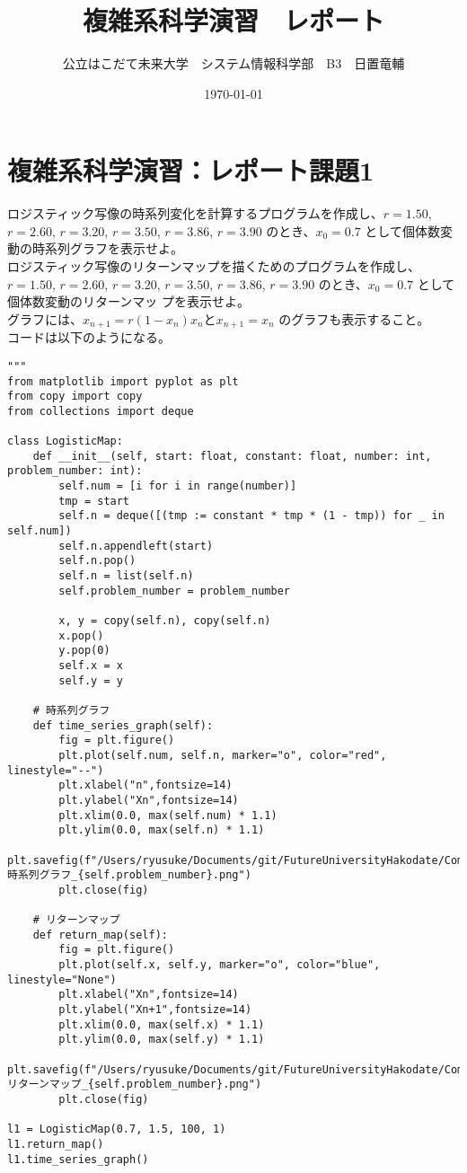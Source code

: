 \documentclass[dvipdfmx,uplatex]{jsarticle}
\title{複雑系科学演習　レポート}
\author{公立はこだて未来大学　システム情報科学部　B3　日置竜輔}
\date{\today}
\begin{document}
\maketitle
\tableofcontents %

\newpage

\section{複雑系科学演習：レポート課題1}

  ロジスティック写像の時系列変化を計算するプログラムを作成し、$r = 1.50$, $r = 2.60$, $r = 3.20$, $r = 3.50$, $r = 3.86$, $r = 3.90$ のとき、$x_{0} = 0.7$ として個体数変動の時系列グラフを表示せよ。\\

 ロジスティック写像のリターンマップを描くためのプログラムを作成し、$r = 1.50$, $r = 2.60$, $r = 3.20$, $r = 3.50$, $r = 3.86$, $r = 3.90$ のとき、$x_{0} = 0.7$ として個体数変動のリターンマッ プを表示せよ。\\
 グラフには、$x_{n+1} = r(1 − x_{n})x_{n} と x_{n+1} = x_{n}$ のグラフも表示すること。\\

コードは以下のようになる。
\begin{lstlisting}[caption=Pythonによるロジスティック写像の描画]
"""
from matplotlib import pyplot as plt
from copy import copy
from collections import deque

class LogisticMap:
    def __init__(self, start: float, constant: float, number: int, problem_number: int):
        self.num = [i for i in range(number)]
        tmp = start
        self.n = deque([(tmp := constant * tmp * (1 - tmp)) for _ in self.num])
        self.n.appendleft(start)
        self.n.pop()
        self.n = list(self.n)
        self.problem_number = problem_number

        x, y = copy(self.n), copy(self.n)
        x.pop()
        y.pop(0)
        self.x = x
        self.y = y

    # 時系列グラフ
    def time_series_graph(self):
        fig = plt.figure()
        plt.plot(self.num, self.n, marker="o", color="red", linestyle="--")
        plt.xlabel("n",fontsize=14)
        plt.ylabel("Xn",fontsize=14)
        plt.xlim(0.0, max(self.num) * 1.1)
        plt.ylim(0.0, max(self.n) * 1.1)
        plt.savefig(f"/Users/ryusuke/Documents/git/FutureUniversityHakodate/ComplexScienceExercise/result/week01_時系列グラフ_{self.problem_number}.png")
        plt.close(fig)

    # リターンマップ
    def return_map(self):
        fig = plt.figure()
        plt.plot(self.x, self.y, marker="o", color="blue", linestyle="None")
        plt.xlabel("Xn",fontsize=14)
        plt.ylabel("Xn+1",fontsize=14)
        plt.xlim(0.0, max(self.x) * 1.1)
        plt.ylim(0.0, max(self.y) * 1.1)
        plt.savefig(f"/Users/ryusuke/Documents/git/FutureUniversityHakodate/ComplexScienceExercise/result/week01_リターンマップ_{self.problem_number}.png")
        plt.close(fig)

l1 = LogisticMap(0.7, 1.5, 100, 1)
l1.return_map()
l1.time_series_graph()
\end{lstlisting}
\end{document}
